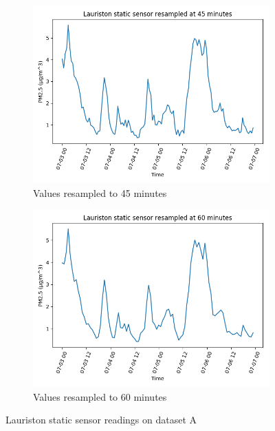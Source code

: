 \begin{figure}
\begin{subfigure}[t]{0.5\textwidth}
\centering
\includegraphics[width=\textwidth]{images/static_sensor_lauriston_resampled_45_min.png}
\caption{Values resampled to 45 minutes}
\label{fig:resample_45}
\end{subfigure}%
%
\hfill
%
\begin{subfigure}[t]{0.5\textwidth}
\centering
\includegraphics[width=\textwidth]{images/static_sensor_lauriston_resampled_60_min.png}
\caption{Values resampled to 60 minutes}
\label{fig:resample_60}
\end{subfigure}

\caption{Lauriston static sensor readings on dataset A}
\label{fig:resamples}
\end{figure}


